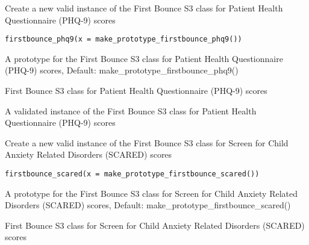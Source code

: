 \documentclass[a4paper]{book}
\begin{document}
%
\begin{Description}\relax
Create a new valid instance of the First Bounce S3 class for Patient Health Questionnaire (PHQ-9) scores
\end{Description}
%
\begin{Usage}
\begin{verbatim}
firstbounce_phq9(x = make_prototype_firstbounce_phq9())
\end{verbatim}
\end{Usage}
%
\begin{Arguments}
\begin{ldescription}
\item[\code{x}] A prototype for the First Bounce S3 class for Patient Health Questionnaire (PHQ-9) scores, Default: make\_prototype\_firstbounce\_phq9()
\end{ldescription}
\end{Arguments}
%
\begin{Details}\relax
First Bounce S3 class for Patient Health Questionnaire (PHQ-9) scores
\end{Details}
%
\begin{Value}
A validated instance of the First Bounce S3 class for Patient Health Questionnaire (PHQ-9) scores
\end{Value}
%
\begin{Description}\relax
Create a new valid instance of the First Bounce S3 class for Screen for Child Anxiety Related Disorders (SCARED) scores
\end{Description}
%
\begin{Usage}
\begin{verbatim}
firstbounce_scared(x = make_prototype_firstbounce_scared())
\end{verbatim}
\end{Usage}
%
\begin{Arguments}
\begin{ldescription}
\item[\code{x}] A prototype for the First Bounce S3 class for Screen for Child Anxiety Related Disorders (SCARED) scores, Default: make\_prototype\_firstbounce\_scared()
\end{ldescription}
\end{Arguments}
%
\begin{Details}\relax
First Bounce S3 class for Screen for Child Anxiety Related Disorders (SCARED) scores
\end{Details}
\end{document}
